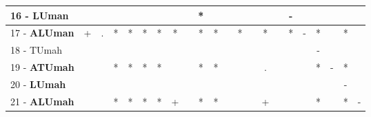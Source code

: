 \begin{table}[h]
\begin{center}
\begin{tabular}{lcc|cc|cc|cc|cc|cc|cc|cc|cc|cc|c}
16 - \textbf{LUman}	&   &   &   &   &   &   &   &   & * &   &   &   &   &   &   & - &   &   &   &   &   \\ \hline
17 - \textbf{ALUman}	& + & . & * & * & * & * & * &   & * & * &   & * &   & * &   & * & - & * &   & * &   \\
18 - TUmah	&   &   &   &   &   &   &   &   &   &   &   &   &   &   &   &   &   & - &   &   &   \\ \hline
19 - \textbf{ATUmah}	&   &   & * & * & * & * &   &   & * & * &   &   &   & . &   &   &   & * & - & * &   \\
20 - \textbf{LUmah}	&   &   &   &   &   &   &   &   &   &   &   &   &   &   &   &   &   &   &   & - &   \\ \hline
21 - \textbf{ALUmah}	&   &   & * & * & * & * & + &   & * & * &   &   &   & + &   &   &   & * &   & * & - \\\end{tabular}
\label{stratsALCKappaFriedVFDT}
\end{center}
\end{table}